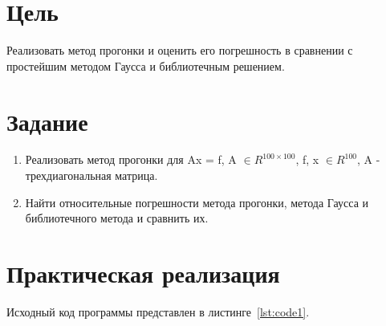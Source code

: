 \documentclass[a4paper, 14pt]{extarticle}
\begin{document}
\renewcommand{\ttdefault}{pcr}

\setlength{\tabcolsep}{3pt}
\newpage
\setcounter{page}{2}

\section{Цель}\label{Sect::goal}

Реализовать метод прогонки и оценить его погрешность в сравнении с простейшим методом Гаусса и библиотечным решением.

\section{Задание}\label{Sect::task}

\begin{enumerate}
    \item Реализовать метод прогонки для Ax = f, A $ \in R^{100×100}$, f, x $ \in R^{100}$, A - трехдиагональная матрица.
    \item Найти относительные погрешности метода прогонки, метода Гаусса и библиотечного метода и сравнить их.
\end{enumerate}

\section{Практическая реализация}\label{Sect::code}

Исходный код программы представлен в листинге~\ref{lst:code1}.   
\end{document}
